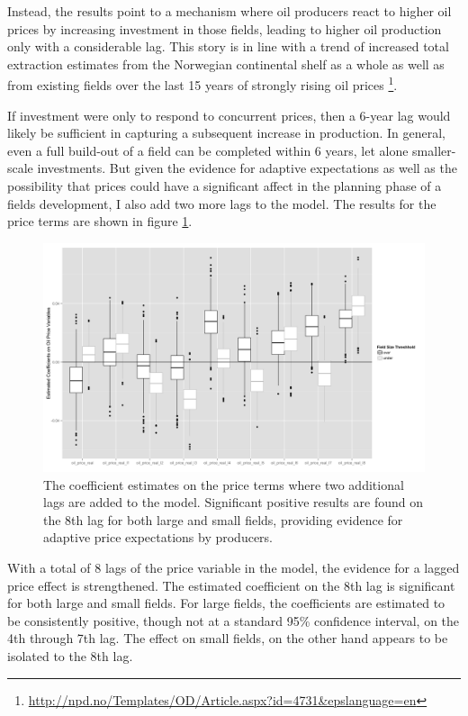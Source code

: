 \documentclass[12pt]{article}
\begin{document}
Instead, the results point to a mechanism where oil producers react to higher oil prices by increasing investment in those fields, leading to higher oil production only with a considerable lag.   This story is in line with a trend of increased total extraction estimates from the Norwegian continental shelf as a whole as well as from existing fields over the last 15 years of strongly rising oil prices \footnote{\url{http://npd.no/Templates/OD/Article.aspx?id=4731&epslanguage=en}}.

If investment were only to respond to concurrent prices, then a 6-year lag would likely be sufficient in capturing a subsequent increase in production.  In general, even a full build-out of a field can be completed within 6 years, let alone smaller-scale investments.  But given the evidence for adaptive expectations as well as the possibility that prices could have a significant affect in the planning phase of a fields development, I also add two more lags to the model.  The results for the price terms are shown in figure \ref{gam_price_8}.

\begin{figure}
	\includegraphics[width=1\textwidth]{figures/gam_price_8_print.png}
	\caption{The coefficient estimates on the price terms where two additional lags are added to the model.  Significant positive results are found on the 8th lag for both large and small fields, providing evidence for adaptive price expectations by producers.}
	\label{gam_price_8}
\end{figure}

With a total of 8 lags of the price variable in the model, the evidence for a lagged price effect is strengthened.  The estimated coefficient on the 8th lag is significant for both large and small fields.  For large fields, the coefficients are estimated to be consistently positive, though not at a standard 95\% confidence interval, on the 4th through 7th lag.  The effect on small fields, on the other hand appears to be isolated to the 8th lag. 
\end{document}

